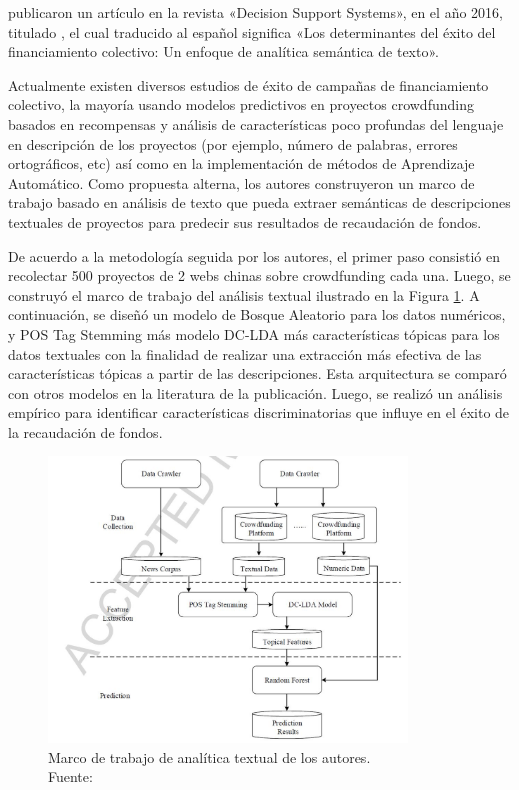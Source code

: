 \newpage
\cite{pr_yuan2016textanalytics} publicaron un artículo en la revista «Decision Support Systems», en el año 2016, titulado , el cual traducido al español significa «Los determinantes del éxito del financiamiento colectivo: Un enfoque de analítica semántica de texto».

Actualmente existen diversos estudios de éxito de campañas de financiamiento colectivo, la mayoría usando modelos predictivos en proyectos crowdfunding basados en recompensas y análisis de características poco profundas del lenguaje en descripción de los proyectos (por ejemplo, número de palabras, errores ortográficos, etc) así como en la implementación de métodos de Aprendizaje Automático. Como propuesta alterna, los autores construyeron un marco de trabajo basado en análisis de texto que pueda extraer semánticas de descripciones textuales de proyectos para predecir sus resultados de recaudación de fondos.

De acuerdo a la metodología seguida por los autores, el primer paso consistió en recolectar 500 proyectos de 2 webs chinas sobre crowdfunding cada una. Luego, se construyó el marco de trabajo del análisis textual ilustrado en la Figura \ref{2:fig117}. A continuación, se diseñó un modelo de Bosque Aleatorio para los datos numéricos, y POS Tag Stemming más modelo DC-LDA más características tópicas para los datos textuales con la finalidad de realizar una extracción más efectiva de las características tópicas a partir de las descripciones. Esta arquitectura se comparó con otros modelos en la literatura de la publicación. Luego, se realizó un análisis empírico para identificar características discriminatorias que influye en el éxito de la recaudación de fondos.

\begin{figure}[!ht]
	\begin{center}
		\includegraphics[width=0.85\textwidth]{2/figures/yuan2016a.jpg}
		\caption[Marco de trabajo de analítica textual de los autores]{Marco de trabajo de analítica textual de los autores.\\
			Fuente: \cite{pr_yuan2016textanalytics}}
		\label{2:fig117}
	\end{center}
\end{figure}

